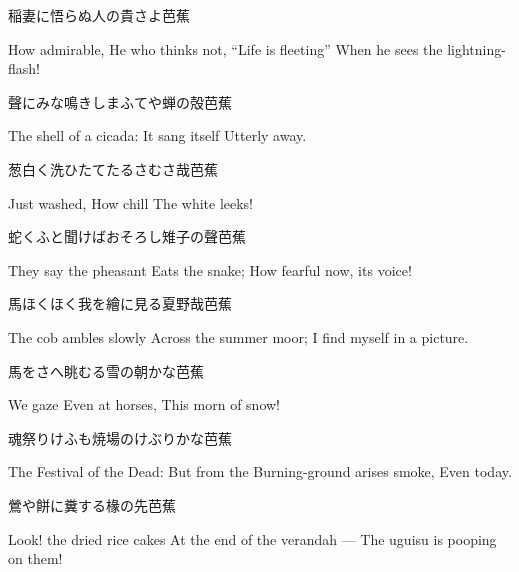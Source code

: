 \begin{haiku}
    {\FH 稲妻に悟らぬ人の貴さよ}\hfill{\FH 芭蕉}

    \vin{} How admirable,
    \vin{} \vin{} He who thinks not, ``Life is fleeting''
    \vin{} \vin{} \vin{} When he sees the lightning-flash!
\end{haiku}

\begin{haiku}
    {\FH 聲にみな鳴きしまふてや蝉の殻}\hfill{\FH 芭蕉}

    \vin{} The shell of a cicada:
    \vin{} \vin{} It sang itself
    \vin{} \vin{} \vin{} Utterly away.
\end{haiku}

\begin{haiku}
    {\FH 葱白く洗ひたてたるさむさ哉}\hfill{\FH 芭蕉}

    \vin{} Just washed,
    \vin{} \vin{} How chill
    \vin{} \vin{} \vin{} The white leeks!
\end{haiku}

\begin{haiku}
    {\FH 蛇くふと聞けばおそろし雉子の聲}\hfill{\FH 芭蕉}

    \vin{} They say the pheasant
    \vin{} \vin{} Eats the snake;
    \vin{} \vin{} \vin{} How fearful now, its voice!
\end{haiku}

\begin{haiku}
    {\FH 馬ほくほく我を繪に見る夏野哉}\hfill{\FH 芭蕉}

    \vin{} The cob ambles slowly
    \vin{} \vin{} Across the summer moor;
    \vin{} \vin{} \vin{} I find myself in a picture.
\end{haiku}

\begin{haiku}
    {\FH 馬をさへ眺むる雪の朝かな}\hfill{\FH 芭蕉}

    \vin{} We gaze
    \vin{} \vin{} Even at horses,
    \vin{} \vin{} \vin{} This morn of snow!
\end{haiku}

\begin{haiku}
    {\FH 魂祭りけふも焼場のけぶりかな}\hfill{\FH 芭蕉}

    \vin{} The Festival of the Dead:
    \vin{} \vin{} But from the Burning-ground arises smoke,
    \vin{} \vin{} \vin{} Even today.
\end{haiku}

\begin{haiku}
    {\FH 鶯や餅に糞する椽の先}\hfill{\FH 芭蕉}

    \vin{} Look! the dried rice cakes
    \vin{} \vin{} At the end of the verandah ---
    \vin{} \vin{} \vin{} The uguisu is pooping on them!
\end{haiku}

